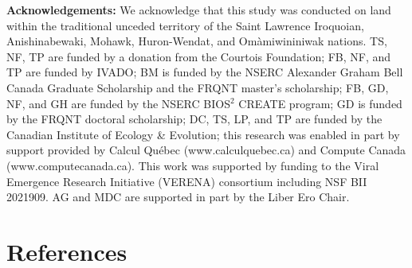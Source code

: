 \documentclass[11pt]{article}
\begin{document}
\textbf{Acknowledgements:} We acknowledge that this study was conducted
on land within the traditional unceded territory of the Saint Lawrence
Iroquoian, Anishinabewaki, Mohawk, Huron-Wendat, and Omàmiwininiwak
nations. TS, NF, TP are funded by a donation from the Courtois
Foundation; FB, NF, and TP are funded by IVADO; BM is funded by the
NSERC Alexander Graham Bell Canada Graduate Scholarship and the FRQNT
master's scholarship; FB, GD, NF, and GH are funded by the NSERC
BIOS\(^2\) CREATE program; GD is funded by the FRQNT doctoral
scholarship; DC, TS, LP, and TP are funded by the Canadian Institute of
Ecology \& Evolution; this research was enabled in part by support
provided by Calcul Québec (www.calculquebec.ca) and Compute Canada
(www.computecanada.ca). This work was supported by funding to the Viral
Emergence Research Initiative (VERENA) consortium including NSF BII
2021909. AG and MDC are supported in part by the Liber Ero Chair.

\hypertarget{references}{%
\section*{References}\label{references}}
\end{document}
